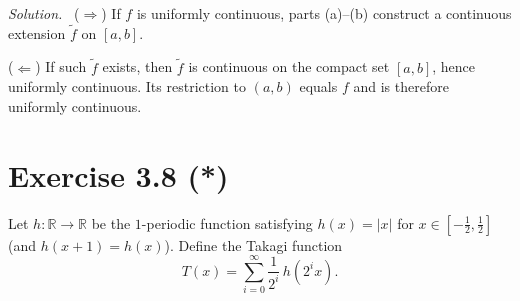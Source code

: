 \documentclass[11pt,a4paper]{article}
\newenvironment{solution}{\par\noindent\textit{Solution.}\ }{\par\vspace{0.5em}}
\begin{document}
\begin{enumerate}
	\begin{solution}
		($\Rightarrow$) If $f$ is uniformly continuous, parts (a)--(b) construct a continuous extension $\tilde f$ on $[a,b]$.
		
		($\Leftarrow$) If such $\tilde f$ exists, then $\tilde f$ is continuous on the compact set $[a,b]$, hence uniformly
		continuous. Its restriction to $(a,b)$ equals $f$ and is therefore uniformly continuous.
	\end{solution}
\end{enumerate}

\section*{Exercise 3.8 (*)}
Let $h:\mathbb{R}\to\mathbb{R}$ be the $1$-periodic function satisfying $h(x)=|x|$ for $x\in[-\tfrac12,\tfrac12]$
(and $h(x+1)=h(x)$). Define the Takagi function
\[
T(x)=\sum_{i=0}^{\infty}\frac1{2^i}\,h(2^i x).
\]
\end{document}
